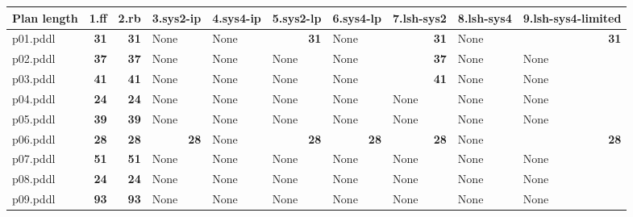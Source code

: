 \documentclass{article}
\begin{document}
\begin{tabular}{@{}lrrrrrrrrr@{}}
Plan length & 1.ff & 2.rb & 3.sys2-ip & 4.sys4-ip & 5.sys2-lp & 6.sys4-lp & 7.lsh-sys2 & 8.lsh-sys4 & 9.lsh-sys4-limited \\
\midrule
p01.pddl & \textbf{31} & \textbf{31} & \multicolumn{1}{|l|}{None} & \multicolumn{1}{|l|}{None} & \textbf{31} & \multicolumn{1}{|l|}{None} & \textbf{31} & \multicolumn{1}{|l|}{None} & \textbf{31} \\
p02.pddl & \textbf{37} & \textbf{37} & \multicolumn{1}{|l|}{None} & \multicolumn{1}{|l|}{None} & \multicolumn{1}{|l|}{None} & \multicolumn{1}{|l|}{None} & \textbf{37} & \multicolumn{1}{|l|}{None} & \multicolumn{1}{|l|}{None} \\
p03.pddl & \textbf{41} & \textbf{41} & \multicolumn{1}{|l|}{None} & \multicolumn{1}{|l|}{None} & \multicolumn{1}{|l|}{None} & \multicolumn{1}{|l|}{None} & \textbf{41} & \multicolumn{1}{|l|}{None} & \multicolumn{1}{|l|}{None} \\
p04.pddl & \textbf{24} & \textbf{24} & \multicolumn{1}{|l|}{None} & \multicolumn{1}{|l|}{None} & \multicolumn{1}{|l|}{None} & \multicolumn{1}{|l|}{None} & \multicolumn{1}{|l|}{None} & \multicolumn{1}{|l|}{None} & \multicolumn{1}{|l|}{None} \\
p05.pddl & \textbf{39} & \textbf{39} & \multicolumn{1}{|l|}{None} & \multicolumn{1}{|l|}{None} & \multicolumn{1}{|l|}{None} & \multicolumn{1}{|l|}{None} & \multicolumn{1}{|l|}{None} & \multicolumn{1}{|l|}{None} & \multicolumn{1}{|l|}{None} \\
p06.pddl & \textbf{28} & \textbf{28} & \textbf{28} & \multicolumn{1}{|l|}{None} & \textbf{28} & \textbf{28} & \textbf{28} & \multicolumn{1}{|l|}{None} & \textbf{28} \\
p07.pddl & \textbf{51} & \textbf{51} & \multicolumn{1}{|l|}{None} & \multicolumn{1}{|l|}{None} & \multicolumn{1}{|l|}{None} & \multicolumn{1}{|l|}{None} & \multicolumn{1}{|l|}{None} & \multicolumn{1}{|l|}{None} & \multicolumn{1}{|l|}{None} \\
p08.pddl & \textbf{24} & \textbf{24} & \multicolumn{1}{|l|}{None} & \multicolumn{1}{|l|}{None} & \multicolumn{1}{|l|}{None} & \multicolumn{1}{|l|}{None} & \multicolumn{1}{|l|}{None} & \multicolumn{1}{|l|}{None} & \multicolumn{1}{|l|}{None} \\
p09.pddl & \textbf{93} & \textbf{93} & \multicolumn{1}{|l|}{None} & \multicolumn{1}{|l|}{None} & \multicolumn{1}{|l|}{None} & \multicolumn{1}{|l|}{None} & \multicolumn{1}{|l|}{None} & \multicolumn{1}{|l|}{None} & \multicolumn{1}{|l|}{None} \\

\end{tabular}
\end{document}
